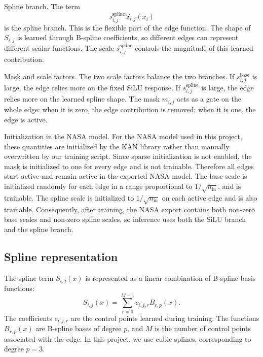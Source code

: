 \documentclass[11pt,a4paper]{article}
\begin{document}
Spline branch.
The term
\begin{equation}
    s^{\mathrm{spline}}_{i,j} S_{i,j}(x_i)
\end{equation}
is the spline branch.
This is the flexible part of the edge function.
The shape of $S_{i,j}$ is learned through B-spline coefficients, so different edges can represent different scalar functions.
The scale $s^{\mathrm{spline}}_{i,j}$ controls the magnitude of this learned contribution.

Mask and scale factors.
The two scale factors balance the two branches.
If $s^{\mathrm{base}}_{i,j}$ is large, the edge relies more on the fixed SiLU response.
If $s^{\mathrm{spline}}_{i,j}$ is large, the edge relies more on the learned spline shape.
The mask $m_{i,j}$ acts as a gate on the whole edge: when it is zero, the edge contribution is removed; when it is one, the edge is active.

Initialization in the NASA model.
For the NASA model used in this project, these quantities are initialized by the KAN library rather than manually overwritten by our training script.
Since sparse initialization is not enabled, the mask is initialized to one for every edge and is not trainable.
Therefore all edges start active and remain active in the exported NASA model.
The base scale is initialized randomly for each edge in a range proportional to $1/\sqrt{n_{\mathrm{in}}}$, and is trainable.
The spline scale is initialized to $1/\sqrt{n_{\mathrm{in}}}$ on each active edge and is also trainable.
Consequently, after training, the NASA export contains both non-zero base scales and non-zero spline scales, so inference uses both the SiLU branch and the spline branch.

\subsection{Spline representation}

The spline term $S_{i,j}(x)$ is represented as a linear combination of B-spline basis functions:
\begin{equation}
    S_{i,j}(x)
    =
    \sum_{r=0}^{M-1}
    c_{i,j,r} B_{r,p}(x).
    \label{eq:spline_expansion}
\end{equation}
The coefficients $c_{i,j,r}$ are the control points learned during training.
The functions $B_{r,p}(x)$ are B-spline bases of degree $p$, and $M$ is the number of control points associated with the edge.
In this project, we use cubic splines, corresponding to degree $p=3$.
\end{document}

